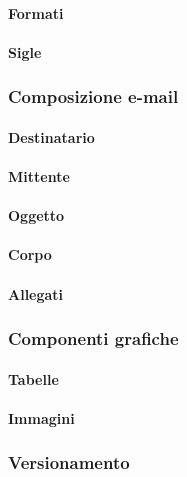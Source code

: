 \paragraph{Formati}

\paragraph{Sigle}

\subsubsection{Composizione e-mail}

\paragraph{Destinatario}

\paragraph{Mittente}

\paragraph{Oggetto}

\paragraph{Corpo}

\paragraph{Allegati}

\subsubsection{Componenti grafiche}

\paragraph{Tabelle}

\paragraph{Immagini}

\subsubsection{Versionamento}

